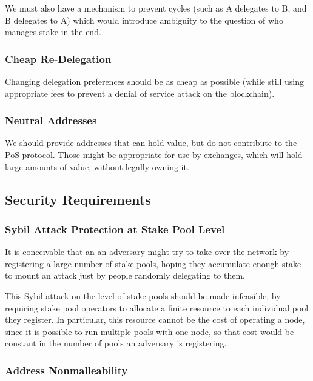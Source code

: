 \documentclass[11pt,a4paper]{article}
\begin{document}
We must also have a mechanism to prevent cycles (such as A delegates to
B, and B delegates to A) which would introduce ambiguity to the question
of who manages stake in the end.

\subsubsection{Cheap Re-Delegation}\label{cheap-re-delegation}

Changing delegation preferences should be as cheap as possible (while
still using appropriate fees to prevent a denial of service attack on
the blockchain).

\subsubsection{Neutral Addresses}\label{neutral-addresses}

We should provide addresses that can hold value, but do not contribute
to the PoS protocol. Those might be appropriate for use by exchanges,
which will hold large amounts of value, without legally owning it.

\subsection{Security Requirements}\label{security-requirements}

\subsubsection{Sybil Attack Protection at Stake Pool
Level}\label{sybil-attack-protection-at-stake-pool-level}

It is conceivable that an an adversary might try to take over the
network by registering a large number of stake pools, hoping they
accumulate enough stake to mount an attack just by people randomly
delegating to them.

This Sybil attack on the level of stake pools should be made infeasible,
by requiring stake pool operators to allocate a finite resource to each
individual pool they register. In particular, this resource cannot be
the cost of operating a node, since it is possible to run multiple pools
with one node, so that cost would be constant in the number of pools an
adversary is registering.

\subsubsection{Address Nonmalleability}\label{address-nonmalleability}
\end{document}
